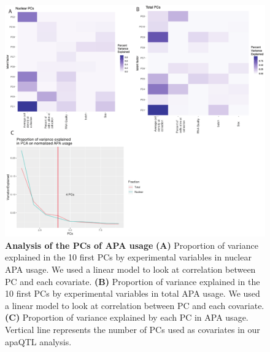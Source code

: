 \begin{figure}[!htb]
\centering
\includegraphics[width=5in]{img/ch02/Fig2_figuresupplement3.pdf}
\caption[Analysis of the PCs of APA usage]{\textbf{Analysis of the PCs of APA usage} {\bf (A)} Proportion of variance explained in the 10 first PCs by experimental variables in nuclear APA usage. We used a linear model to look at correlation between PC and each covariate. {\bf (B)} Proportion of variance explained in the 10 first PCs by experimental variables in total APA usage. We used a linear model to look at correlation between PC and each covariate. {\bf (C)} Proportion of variance explained by each PC in APA usage. Vertical line represents the number of PCs used as covariates in our apaQTL analysis.}
\label{fig:PCA}
\end{figure}
\clearpage

